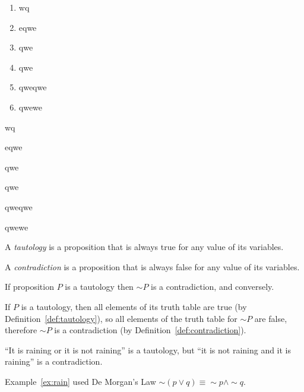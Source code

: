 \begin{enumerate}
	\item wq
	\item eqwe
	\item qwe
	\item qwe
	\item qweqwe
	\item qwewe
\end{enumerate}

\begin{compactenum}
	\item wq
	\item eqwe
	\item qwe
	\item qwe
	\item qweqwe
	\item qwewe
\end{compactenum}


\begin{Definition}[Tautology]\label{def:tautology}
A \emph{tautology} is a proposition that is always true for any value of its variables.
\end{Definition}

\begin{Definition}[Contradiction]\label{def:contradiction}
A \emph{contradiction} is a proposition that is always false for any value of its variables.
\end{Definition}

\begin{Theorem}
If proposition $P$ is a tautology then $\sim P$ is a contradiction, and conversely.
\begin{Proof}
If $P$ is a tautology, then all elements of its truth table are true (by Definition~\ref{def:tautology}), so all elements of the truth table for $\sim P$ are false, therefore $\sim P$ is a contradiction (by Definition~\ref{def:contradiction}).
\end{Proof}
\end{Theorem}

\begin{Example}\label{ex:rain}
``It is raining or it is not raining'' is a tautology, but ``it is not raining and it is raining'' is a contradiction.
\end{Example}

\begin{Remark}
Example~\ref{ex:rain} used De Morgan's Law $\sim (p \vee q) \equiv \sim p \wedge \sim q$.
\end{Remark}

